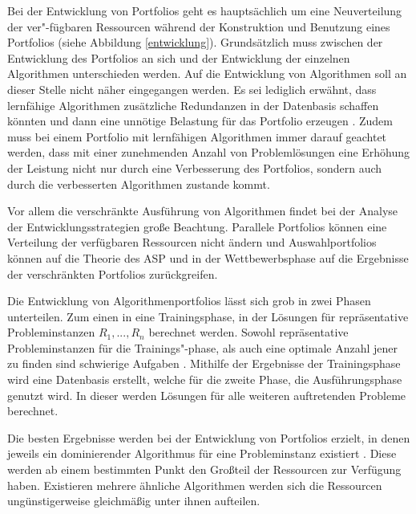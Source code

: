Bei der Entwicklung von Portfolios geht es hauptsächlich um eine Neuverteilung der ver"-fügbaren Ressourcen während der Konstruktion und Benutzung eines Portfolios (siehe Abbildung \ref{entwicklung}). Grundsätzlich muss zwischen der Entwicklung des Portfolios an sich und der Entwicklung der einzelnen Algorithmen unterschieden werden. Auf die Entwicklung von Algorithmen soll an dieser Stelle nicht näher eingegangen werden. Es sei lediglich erwähnt, dass lernfähige Algorithmen zusätzliche Redundanzen in der Datenbasis schaffen könnten und dann eine unnötige Belastung für das Portfolio erzeugen \cite{roberts06}. Zudem muss bei einem Portfolio mit lernfähigen Algorithmen immer darauf geachtet werden, dass mit einer zunehmenden Anzahl von Problemlösungen eine Erhöhung der Leistung nicht nur durch eine Verbesserung des Portfolios, sondern auch durch die verbesserten Algorithmen zustande kommt.

Vor allem die verschränkte Ausführung von Algorithmen findet bei der Analyse der Entwicklungsstrategien große Beachtung. Parallele Portfolios können eine Verteilung der verfügbaren Ressourcen nicht ändern und Auswahlportfolios können auf die Theorie des ASP und in der Wettbewerbsphase auf die Ergebnisse der verschränkten Portfolios zurückgreifen.

Die Entwicklung von Algorithmenportfolios lässt sich grob in zwei Phasen unterteilen. Zum einen in eine Trainingsphase, in der Lösungen für repräsentative Probleminstanzen $R_1, ..., R_n$ berechnet werden. Sowohl repräsentative Probleminstanzen für die Trainings"-phase, als auch eine optimale Anzahl jener zu finden sind schwierige Aufgaben \cite{gaglioloschmidhuber06}. Mithilfe der Ergebnisse der Trainingsphase wird eine Datenbasis erstellt, welche für die zweite Phase, die Ausführungsphase genutzt wird. In dieser werden Lösungen für alle weiteren auftretenden Probleme berechnet. 

Die besten Ergebnisse werden bei der Entwicklung von Portfolios erzielt, in denen jeweils ein dominierender Algorithmus für eine Probleminstanz existiert \cite{gomesselman97, gaglioloschmidhuber06}. Diese werden ab einem bestimmten Punkt den Großteil der Ressourcen zur Verfügung haben. Existieren mehrere ähnliche Algorithmen werden sich die Ressourcen ungünstigerweise gleichmäßig unter ihnen aufteilen.

